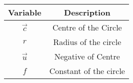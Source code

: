\begin{center}
    \begin{tabular}{|c|c|} 
        \hline
            \textbf{Variable} & \textbf{Description} \\ 
        \hline
	    $\vec{c}$ & Centre of the Circle \\
        \hline
        ${r}$ & Radius of the circle\\
        \hline
        $\vec{u}$ & Negative of Centre \\
        \hline 
        $f$ & Constant of the circle  \\
        \hline
        
    \end{tabular}
\end{center}
